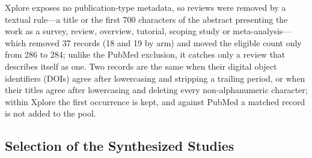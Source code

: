 \documentclass[journal]{IEEEtran}
\begin{document}
Xplore exposes no publication-type metadata, so reviews were removed by a textual rule---a title or the first 700 characters of the abstract presenting the work as a survey, review, overview, tutorial, scoping study or meta-analysis---which removed 37 records (18 and 19 by arm) and moved the eligible count only from 286 to 284; unlike the PubMed exclusion, it catches only a review that describes itself as one. Two records are the same when their digital object identifiers (DOIs) agree after lowercasing and stripping a trailing period, or when their titles agree after lowercasing and deleting every non-alphanumeric character; within Xplore the first occurrence is kept, and against PubMed a matched record is not added to the pool.

\subsection{Selection of the Synthesized Studies}
\label{sec:selection}
\end{document}
